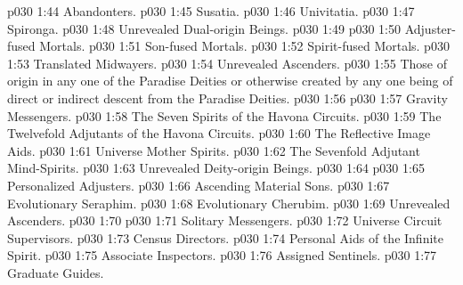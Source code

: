 \vs p030 1:44 \bibnobreakspace Abandonters.
\vs p030 1:45 \bibnobreakspace Susatia.
\vs p030 1:46 \bibnobreakspace Univitatia.
\vs p030 1:47 \bibnobreakspace Spironga.
\vs p030 1:48 \bibnobreakspace Unrevealed Dual\hyp{}origin Beings.
\vs p030 1:49 \bibnobreakspace {}
\vs p030 1:50 \bibnobreakspace Adjuster\hyp{}fused Mortals.
\vs p030 1:51 \bibnobreakspace Son\hyp{}fused Mortals.
\vs p030 1:52 \bibnobreakspace Spirit\hyp{}fused Mortals.
\vs p030 1:53 \bibnobreakspace Translated Midwayers.
\vs p030 1:54 \bibnobreakspace Unrevealed Ascenders.
\vs p030 1:55 \bibnobreakspace {} Those of origin in any one of the Paradise Deities or otherwise created by any one being of direct or indirect descent from the Paradise Deities.
\vs p030 1:56 \bibnobreakspace {}
\vs p030 1:57 \bibnobreakspace Gravity Messengers.
\vs p030 1:58 \bibnobreakspace The Seven Spirits of the Havona Circuits.
\vs p030 1:59 \bibnobreakspace The Twelvefold Adjutants of the Havona Circuits.
\vs p030 1:60 \bibnobreakspace The Reflective Image Aids.
\vs p030 1:61 \bibnobreakspace Universe Mother Spirits.
\vs p030 1:62 \bibnobreakspace The Sevenfold Adjutant Mind\hyp{}Spirits.
\vs p030 1:63 \bibnobreakspace Unrevealed Deity\hyp{}origin Beings.
\vs p030 1:64 \bibnobreakspace {}
\vs p030 1:65 \bibnobreakspace Personalized Adjusters.
\vs p030 1:66 \bibnobreakspace Ascending Material Sons.
\vs p030 1:67 \bibnobreakspace Evolutionary Seraphim.
\vs p030 1:68 \bibnobreakspace Evolutionary Cherubim.
\vs p030 1:69 \bibnobreakspace Unrevealed Ascenders.
\vs p030 1:70 \bibnobreakspace {}
\vs p030 1:71 \bibnobreakspace Solitary Messengers.
\vs p030 1:72 \bibnobreakspace Universe Circuit Supervisors.
\vs p030 1:73 \bibnobreakspace Census Directors.
\vs p030 1:74 \bibnobreakspace Personal Aids of the Infinite Spirit.
\vs p030 1:75 \bibnobreakspace Associate Inspectors.
\vs p030 1:76 \bibnobreakspace Assigned Sentinels.
\vs p030 1:77 \bibnobreakspace Graduate Guides.
